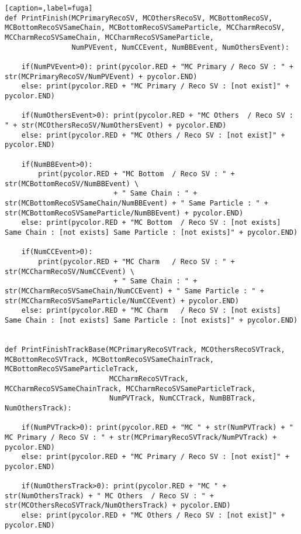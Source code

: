\begin{lstlisting}[caption=,label=fuga]
def PrintFinish(MCPrimaryRecoSV, MCOthersRecoSV, MCBottomRecoSV, MCBottomRecoSVSameChain, MCBottomRecoSVSameParticle, MCCharmRecoSV, MCCharmRecoSVSameChain, MCCharmRecoSVSameParticle,
                NumPVEvent, NumCCEvent, NumBBEvent, NumOthersEvent):

    if(NumPVEvent>0): print(pycolor.RED + "MC Primary / Reco SV : " + str(MCPrimaryRecoSV/NumPVEvent) + pycolor.END)
    else: print(pycolor.RED + "MC Primary / Reco SV : [not exist]" + pycolor.END)

    if(NumOthersEvent>0): print(pycolor.RED + "MC Others  / Reco SV : " + str(MCOthersRecoSV/NumOthersEvent) + pycolor.END)
    else: print(pycolor.RED + "MC Others / Reco SV : [not exist]" + pycolor.END)

    if(NumBBEvent>0):
        print(pycolor.RED + "MC Bottom  / Reco SV : " + str(MCBottomRecoSV/NumBBEvent) \
                          + " Same Chain : " + str(MCBottomRecoSVSameChain/NumBBEvent) + " Same Particle : " + str(MCBottomRecoSVSameParticle/NumBBEvent) + pycolor.END)
    else: print(pycolor.RED + "MC Bottom  / Reco SV : [not exists] Same Chain : [not exists] Same Particle : [not exists]" + pycolor.END)

    if(NumCCEvent>0):
        print(pycolor.RED + "MC Charm   / Reco SV : " + str(MCCharmRecoSV/NumCCEvent) \
                          + " Same Chain : " + str(MCCharmRecoSVSameChain/NumCCEvent) + " Same Particle : " + str(MCCharmRecoSVSameParticle/NumCCEvent) + pycolor.END)
    else: print(pycolor.RED + "MC Charm   / Reco SV : [not exists] Same Chain : [not exists] Same Particle : [not exists]" + pycolor.END)


def PrintFinishTrackBase(MCPrimaryRecoSVTrack, MCOthersRecoSVTrack, MCBottomRecoSVTrack, MCBottomRecoSVSameChainTrack, MCBottomRecoSVSameParticleTrack, 
                         MCCharmRecoSVTrack, MCCharmRecoSVSameChainTrack, MCCharmRecoSVSameParticleTrack,
                         NumPVTrack, NumCCTrack, NumBBTrack, NumOthersTrack):

    if(NumPVTrack>0): print(pycolor.RED + "MC " + str(NumPVTrack) + " MC Primary / Reco SV : " + str(MCPrimaryRecoSVTrack/NumPVTrack) + pycolor.END)
    else: print(pycolor.RED + "MC Primary / Reco SV : [not exist]" + pycolor.END)

    if(NumOthersTrack>0): print(pycolor.RED + "MC " + str(NumOthersTrack) + " MC Others  / Reco SV : " + str(MCOthersRecoSVTrack/NumOthersTrack) + pycolor.END)
    else: print(pycolor.RED + "MC Others / Reco SV : [not exist]" + pycolor.END)


\end{lstlisting}
